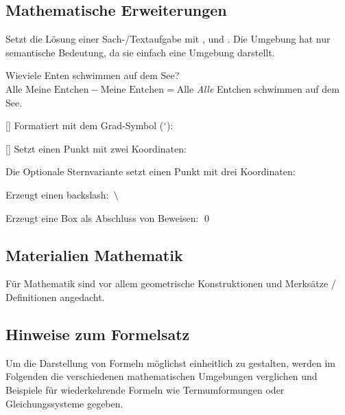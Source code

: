 \subsection{Mathematische Erweiterungen}\label{sec:allgemeinmathe}
\begin{environments}
	Setzt die Lösung einer Sach-/Textaufgabe mit ,  und . Die Umgebung hat nur semantische Bedeutung, da sie einfach eine  Umgebung darstellt.
	
	\begin{example}
		\begin{sachaufgabe}
			\frage Wieviele Enten schwimmen auf dem See?
			\rechnung $\text{Alle Meine Entchen} - \text{Meine Entchen} = \text{Alle}$
			\antwort \emph{Alle} Entchen schwimmen auf dem See.
		\end{sachaufgabe}
	\end{example}
\end{environments}
\begin{commands}
	[] Formatiert  mit dem Grad-Symbol ($^\circ$): 
	
	[\sarg{}] Setzt einen Punkt mit zwei Koordinaten: 
	
	Die Optionale Sternvariante setzt einen Punkt mit drei Koordinaten: 
	
	 Erzeugt einen backslash: $\,\backslash\,$
	
	 Erzeugt eine Box als Abschluss von Beweisen: \qed
\end{commands}

\subsection{Materialien Mathematik}\label{sec:materialmathe}
Für Mathematik sind vor allem geometrische Konstruktionen und Merksätze / Definitionen angedacht.

\subsection{Hinweise zum Formelsatz}\label{sec:formelsatz}
Um die Darstellung von Formeln möglichst einheitlich zu gestalten, werden im Folgenden die verschiedenen mathematischen Umgebungen verglichen und Beispiele für wiederkehrende Formeln wie Termumformungen oder Gleichungssysteme gegeben.


